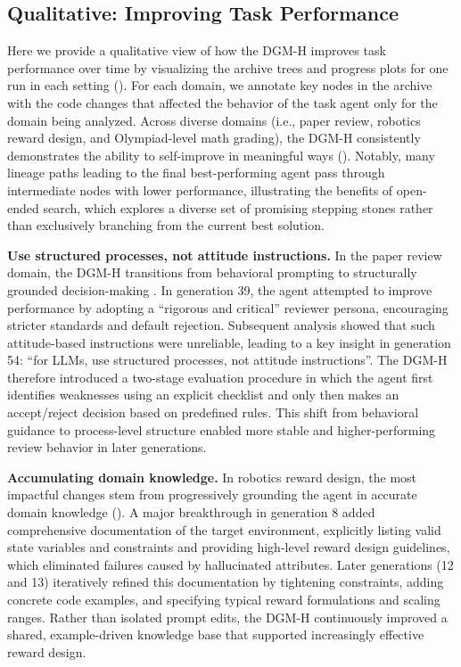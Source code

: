 \documentclass[]{fairmeta}
\begin{document}
\subsection{Qualitative: Improving Task Performance}
\label{app:qual-task}

Here we provide a qualitative view of how the DGM-H improves task performance over time by visualizing the archive trees and progress plots for one run in each setting (). For each domain, we annotate key nodes in the archive with the code changes that affected the behavior of the task agent only for the domain being analyzed. Across diverse domains (i.e., paper review, robotics reward design, and Olympiad-level math grading), the DGM-H consistently demonstrates the ability to self-improve in meaningful ways (). Notably, many lineage paths leading to the final best-performing agent pass through intermediate nodes with lower performance, illustrating the benefits of open-ended search, which explores a diverse set of promising stepping stones rather than exclusively branching from the current best solution.

\textbf{Use structured processes, not attitude instructions.} In the paper review domain, the DGM-H transitions from behavioral prompting to structurally grounded decision-making . In generation 39, the agent attempted to improve performance by adopting a ``rigorous and critical'' reviewer persona, encouraging stricter standards and default rejection. Subsequent analysis showed that such attitude-based instructions were unreliable, leading to a key insight in generation 54: ``for LLMs, use structured processes, not attitude instructions''. The DGM-H therefore introduced a two-stage evaluation procedure in which the agent first identifies weaknesses using an explicit checklist and only then makes an accept/reject decision based on predefined rules. This shift from behavioral guidance to process-level structure enabled more stable and higher-performing review behavior in later generations.

\textbf{Accumulating domain knowledge.} In robotics reward design, the most impactful changes stem from progressively grounding the agent in accurate domain knowledge (). A major breakthrough in generation 8 added comprehensive documentation of the target environment, explicitly listing valid state variables and constraints and providing high-level reward design guidelines, which eliminated failures caused by hallucinated attributes. Later generations (12 and 13) iteratively refined this documentation by tightening constraints, adding concrete code examples, and specifying typical reward formulations and scaling ranges. Rather than isolated prompt edits, the DGM-H continuously improved a shared, example-driven knowledge base that supported increasingly effective reward design.
\end{document}
